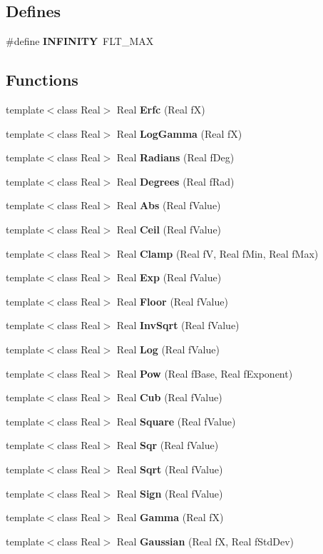 \subsection*{Defines}
\begin{CompactItemize}
\item 
\#define {\bf INFINITY}\ FLT\_\-MAX
\end{CompactItemize}
\subsection*{Functions}
\begin{CompactItemize}
\item 
template$<$class Real$>$ Real {\bf Erfc} (Real f\-X)
\item 
template$<$class Real$>$ Real {\bf Log\-Gamma} (Real f\-X)
\item 
template$<$class Real$>$ Real {\bf Radians} (Real f\-Deg)
\item 
template$<$class Real$>$ Real {\bf Degrees} (Real f\-Rad)
\item 
template$<$class Real$>$ Real {\bf Abs} (Real f\-Value)
\item 
template$<$class Real$>$ Real {\bf Ceil} (Real f\-Value)
\item 
template$<$class Real$>$ Real {\bf Clamp} (Real f\-V, Real f\-Min, Real f\-Max)
\item 
template$<$class Real$>$ Real {\bf Exp} (Real f\-Value)
\item 
template$<$class Real$>$ Real {\bf Floor} (Real f\-Value)
\item 
template$<$class Real$>$ Real {\bf Inv\-Sqrt} (Real f\-Value)
\item 
template$<$class Real$>$ Real {\bf Log} (Real f\-Value)
\item 
template$<$class Real$>$ Real {\bf Pow} (Real f\-Base, Real f\-Exponent)
\item 
template$<$class Real$>$ Real {\bf Cub} (Real f\-Value)
\item 
template$<$class Real$>$ Real {\bf Square} (Real f\-Value)
\item 
template$<$class Real$>$ Real {\bf Sqr} (Real f\-Value)
\item 
template$<$class Real$>$ Real {\bf Sqrt} (Real f\-Value)
\item 
template$<$class Real$>$ Real {\bf Sign} (Real f\-Value)
\item 
template$<$class Real$>$ Real {\bf Gamma} (Real f\-X)
\item 
template$<$class Real$>$ Real {\bf Gaussian} (Real f\-X, Real f\-Std\-Dev)

\end{CompactItemize}
